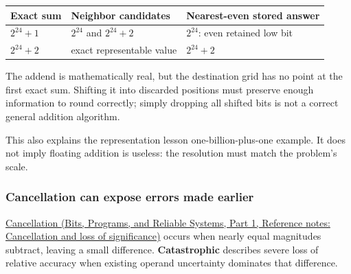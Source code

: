 {\def\LTcaptype{none} %
\begin{longtable}[]{@{}
  >{\raggedright\arraybackslash}p{}
  >{\raggedright\arraybackslash}p{}
  >{\raggedright\arraybackslash}p{}@{}}
\toprule\noalign{}
\begin{minipage}[b]{\linewidth}\raggedright
Exact sum
\end{minipage} & \begin{minipage}[b]{\linewidth}\raggedright
Neighbor candidates
\end{minipage} & \begin{minipage}[b]{\linewidth}\raggedright
Nearest-even stored answer
\end{minipage} \\
\midrule\noalign{}
\endhead
\bottomrule\noalign{}
\endlastfoot
\(2^{24}+1\) & \(2^{24}\) and \(2^{24}+2\) & \(2^{24}\): even retained low bit \\
\(2^{24}+2\) & exact representable value & \(2^{24}+2\) \\
\end{longtable}
}

The addend is mathematically real, but the destination grid has no point at the first exact sum. Shifting it into discarded positions must preserve enough information to round correctly; simply dropping all shifted bits is not a correct general addition algorithm.

This also explains the representation lesson one-billion-plus-one example. It does not imply floating addition is useless: the resolution must match the problem's scale.

\subsubsection{Cancellation can expose errors made earlier}\label{05-engine-i-ch001-cancellation-can-expose-errors-made-earlier}

\hypertarget{05-engine-i-ch001-cancellation-can-expose-errors-made-earlier}{}

\href{../01-Bits-Programs-and-Reliable-Systems-P01/main.pdf\#nameddest=appendix-a2773a6a2f9d}{Cancellation (Bits, Programs, and Reliable Systems, Part 1, Reference notes: Cancellation and loss of significance)} occurs when nearly equal magnitudes subtract, leaving a small difference. \textbf{Catastrophic} describes severe loss of relative accuracy when existing operand uncertainty dominates that difference.

